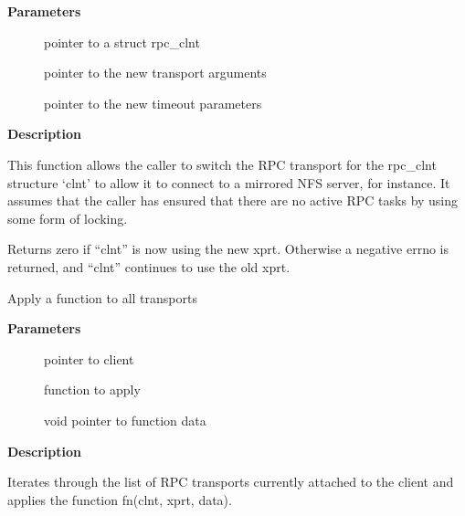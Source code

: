 \documentclass[a4paper,8pt,english]{sphinxmanual}
\begin{document}
\textbf{Parameters}
\begin{description}
\item[{}] \leavevmode
pointer to a struct rpc\_clnt

\item[{}] \leavevmode
pointer to the new transport arguments

\item[{}] \leavevmode
pointer to the new timeout parameters

\end{description}

\textbf{Description}

This function allows the caller to switch the RPC transport for the
rpc\_clnt structure `clnt' to allow it to connect to a mirrored NFS
server, for instance.  It assumes that the caller has ensured that
there are no active RPC tasks by using some form of locking.

Returns zero if ``clnt'' is now using the new xprt.  Otherwise a
negative errno is returned, and ``clnt'' continues to use the old
xprt.

\begin{fulllineitems}
\label{networking/kapi:c.rpc_clnt_iterate_for_each_xprt}
Apply a function to all transports

\end{fulllineitems}


\textbf{Parameters}
\begin{description}
\item[{}] \leavevmode
pointer to client

\item[{}] \leavevmode
function to apply

\item[{}] \leavevmode
void pointer to function data

\end{description}

\textbf{Description}

Iterates through the list of RPC transports currently attached to the
client and applies the function fn(clnt, xprt, data).
\end{document}
